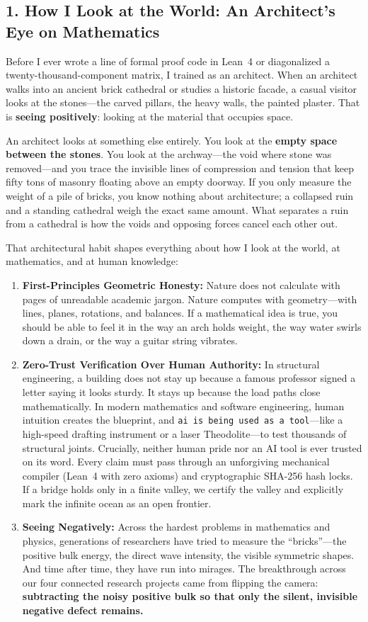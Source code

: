 \documentclass[11pt,a4paper]{article}
\begin{document}
\subsection*{1. How I Look at the World: An Architect's Eye on Mathematics}

Before I ever wrote a line of formal proof code in Lean~4 or diagonalized a twenty-thousand-component matrix, I trained as an architect. When an architect walks into an ancient brick cathedral or studies a historic facade, a casual visitor looks at the stones---the carved pillars, the heavy walls, the painted plaster. That is \textbf{seeing positively}: looking at the material that occupies space.

An architect looks at something else entirely. You look at the \textbf{empty space between the stones}. You look at the archway---the void where stone was removed---and you trace the invisible lines of compression and tension that keep fifty tons of masonry floating above an empty doorway. If you only measure the weight of a pile of bricks, you know nothing about architecture; a collapsed ruin and a standing cathedral weigh the exact same amount. What separates a ruin from a cathedral is how the voids and opposing forces cancel each other out.

That architectural habit shapes everything about how I look at the world, at mathematics, and at human knowledge:

\begin{enumerate}
  \item \textbf{First-Principles Geometric Honesty:} Nature does not calculate with pages of unreadable academic jargon. Nature computes with geometry---with lines, planes, rotations, and balances. If a mathematical idea is true, you should be able to feel it in the way an arch holds weight, the way water swirls down a drain, or the way a guitar string vibrates.
  \item \textbf{Zero-Trust Verification Over Human Authority:} In structural engineering, a building does not stay up because a famous professor signed a letter saying it looks sturdy. It stays up because the load paths close mathematically. In modern mathematics and software engineering, human intuition creates the blueprint, and \texttt{ai is being used as a tool}---like a high-speed drafting instrument or a laser Theodolite---to test thousands of structural joints. Crucially, neither human pride nor an AI tool is ever trusted on its word. Every claim must pass through an unforgiving mechanical compiler (Lean~4 with zero axioms) and cryptographic SHA-256 hash locks. If a bridge holds only in a finite valley, we certify the valley and explicitly mark the infinite ocean as an open frontier.
  \item \textbf{Seeing Negatively:} Across the hardest problems in mathematics and physics, generations of researchers have tried to measure the ``bricks''---the positive bulk energy, the direct wave intensity, the visible symmetric shapes. And time after time, they have run into mirages. The breakthrough across our four connected research projects came from flipping the camera: \textbf{subtracting the noisy positive bulk so that only the silent, invisible negative defect remains.}
\end{enumerate}
\end{document}
